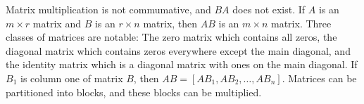 \documentclass{article}
\begin{document}
    Matrix multiplication is not commumative, and $BA$ does not exist.
    If $A$ is an $m \times r$ matrix and $B$ is an $r \times n$ matrix, 
    then $AB$ is an $m \times n$ matrix.
    Three classes of matrices are notable: 
    The zero matrix which contains all zeros, 
    the diagonal matrix which contains zeros everywhere except the main diagonal,
    and the identity matrix which is a diagonal matrix with ones on the main diagonal.
    If $B_1$ is column one of matrix $B$,
    then $AB = [AB_1, AB_2, \dots, AB_n]$.
    Matrices can be partitioned into blocks, and these blocks can be multiplied.
    
\end{document}

